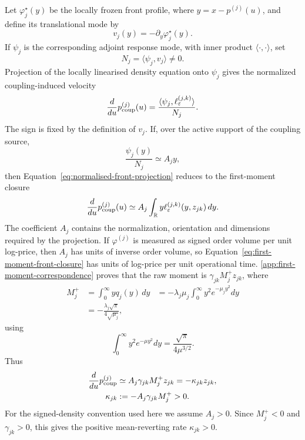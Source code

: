 \documentclass[5p,final]{elsarticle}
\begin{document}
Let $\varphi_j^\star(y)$ be the locally frozen front profile, where $y=x-p^{(j)}(u)$, and define its translational mode by
\begin{equation}
    v_j(y)=-\partial_y\varphi_j^\star(y).
\end{equation}
If $\psi_j$ is the corresponding adjoint response mode, with inner product $\langle\cdot,\cdot\rangle$, set
\begin{equation}
    N_j=\langle\psi_j,v_j\rangle\neq0.
\end{equation}
Projection of the locally linearised density equation onto $\psi_j$ gives the normalized coupling-induced velocity
\begin{equation}
    \frac{d}{du}p_{\rm coup}^{(j)}(u)
    =\frac{\langle\psi_j,\ell_\varepsilon^{(j,k)}\rangle}{N_j}.
    \label{eq:normalised-front-projection}
\end{equation}
The sign is fixed by the definition of $v_j$. If, over the active support of the coupling source,
\begin{equation}
    \frac{\psi_j(y)}{N_j}\simeq A_jy,
    \label{eq:first-moment-mode}
\end{equation}
then Equation~\eqref{eq:normalised-front-projection} reduces to the first-moment closure
\begin{equation}
    \frac{d}{du}p_{\rm coup}^{(j)}(u)
    \simeq A_j\int_{\mathbb R}y\ell_\varepsilon^{(j,k)}(y,z_{jk})\,dy.
    \label{eq:first-moment-front-closure}
\end{equation}
The coefficient $A_j$ contains the normalization, orientation and dimensions required by the projection. If $\varphi^{(j)}$ is measured as signed order volume per unit log-price, then $A_j$ has units of inverse order volume, so Equation~\eqref{eq:first-moment-front-closure} has units of log-price per unit operational time. \ref{app:first-moment-correspondence} proves that the raw moment is $\gamma_{jk}M_j^+z_{jk}$, where
\begin{align}
    M_j^+&=\int_0^\infty yq_j(y)\,dy
    &=-\lambda_j\mu_j\int_0^\infty
    y^2e^{-\mu_jy^2}dy\\
    &=-\frac{\lambda_j\sqrt{\pi}}{4\sqrt{\mu_j}},
\end{align}
using
\begin{equation}
    \int_0^\infty y^2e^{-\mu y^2}dy
    =\frac{\sqrt{\pi}}{4\mu^{3/2}}.
\end{equation}
Thus
\begin{align}
    \frac{d}{du}p_{\rm coup}^{(j)}
    &\simeq A_j\gamma_{jk}M_j^+z_{jk}
    =-\kappa_{jk}z_{jk},\\
    \kappa_{jk}&:=-A_j\gamma_{jk}M_j^+>0.
    \label{eq:ordered-pair-rate}
\end{align}
For the signed-density convention used here we assume $A_j>0$. Since $M_j^+<0$ and $\gamma_{jk}>0$, this gives the positive mean-reverting rate $\kappa_{jk}>0$.
\end{document}
